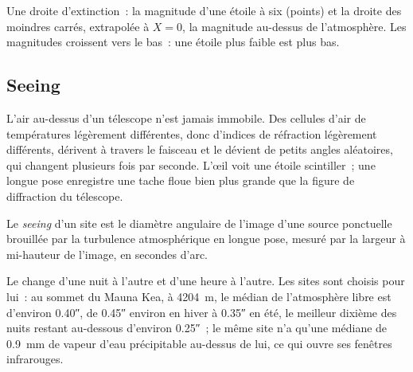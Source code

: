 \begin{omfigure}

{\small Une droite d'extinction~: la magnitude d'une étoile à six 
(points) et la droite des moindres carrés, extrapolée à $X = 0$, la magnitude
au-dessus de l'atmosphère. Les magnitudes croissent vers le bas~: une étoile
plus faible est plus bas.}
\end{omfigure}

\subsection*{Seeing}

L'air au-dessus d'un télescope n'est jamais immobile. Des cellules d'air de
températures légèrement différentes, donc d'indices de réfraction légèrement
différents, dérivent à travers le faisceau et le dévient de petits angles
aléatoires, qui changent plusieurs fois par seconde. L'œil voit une étoile
scintiller~; une longue pose enregistre une tache floue bien plus grande que la
figure de diffraction du télescope.

\begin{definition}[Le seeing]\label{def:b1:observing-the-sky:seeing}
Le \emph{seeing} d'un site est le diamètre angulaire de l'image
d'une source ponctuelle brouillée par la turbulence atmosphérique en longue
pose, mesuré par la largeur à mi-hauteur de l'image, en secondes d'arc.
\end{definition}

Le  change d'une nuit à l'autre et d'une heure à l'autre. Les sites sont
choisis pour lui~: au sommet du Mauna Kea, à \qty{4204}{m}, le  médian de
l'atmosphère libre est d'environ \ang{;;0.40}, de \ang{;;0.45} environ en
hiver à \ang{;;0.35} en été, le meilleur dixième des nuits restant au-dessous
d'environ \ang{;;0.25}~; le même site n'a qu'une médiane de \qty{0.9}{mm} de
vapeur d'eau précipitable au-dessus de lui, ce qui ouvre ses fenêtres
infrarouges.

